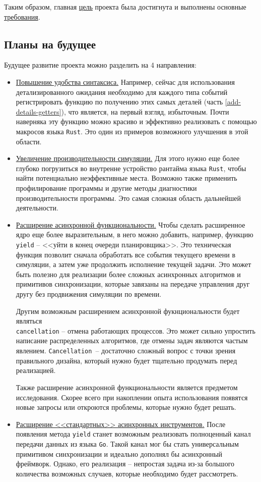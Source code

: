 Таким образом, главная \hyperref[main-purpose]{цель} проекта была достигнута и выполнены основные \hyperref[requirements]{требования}. 

\subsection{Планы на будущее} \label{future-plans}
Будущее развитие проекта можно разделить на 4 направления: 
\begin{itemize}
    \item \underline{Повышение удобства синтаксиса.} Например, сейчас для использования детализированного ожидания необходимо для каждого типа событий регистрировать функцию по получению этих самых деталей (часть \ref{add-details-getters}), что является, на первый взгляд, избыточным. Почти наверняка эту функцию можно красиво и эффективно реализовать с помощью макросов языка \texttt{Rust}. Это один из примеров возможного улучшения в этой области. 
    \item \underline{Увеличение производительности симуляции.} Для этого нужно еще более глубоко погрузиться во внутренне устройство рантайма языка \texttt{Rust}, чтобы найти потенциально неэффективные места. Возможно также применить профилирование программы и другие методы диагностики производительности программы. Это самая сложная область дальнейшей деятельности. 
    \item \underline{Расширение асинхронной функциональности.} Чтобы сделать расширенное ядро еще более выразительным, в него можно добавить, например, функцию \texttt{yield} -- <<уйти в конец очереди планировщика>>. Это техническая функция позволит сначала обработать все события текущего времени в симуляции, а затем уже продолжить исполнение текущей задачи. Это может быть полезно для реализации более сложных асинхронных алгоритмов и примитивов синхронизации, которые завязаны на передаче управления друг другу без продвижения симуляции по времени. 
    
    Другим возможным расширением асинхронной фукнциональности будет являться \\ \texttt{cancellation} -- отмена работающих процессов. Это может сильно упростить написание распределенных алгоритмов, где отмены задач являются частым явлением. \texttt{Cancellation}~-- достаточно сложный вопрос с точки зрения правильного дизайна, который нужно будет тщательно продумать перед реализацией.
    
    Также расширение асинхронной функциональности является предметом исследования. Скорее всего при накоплении опыта использования появятся новые запросы или откроются проблемы, которые нужно будет решать.
    \item \underline{Расширение <<стандартных>> асинхронных инструментов.} После появления метода \texttt{yield} станет возможным реализовать полноценный канал передачи данных из языка \texttt{Go}. Такой канал мог бы стать универсальным примитивом синхронизации и  идеально дополнял бы асинхронный фреймворк. Однако, его реализация -- непростая задача из-за большого количества возможных случаев, которые необходимо будет рассмотреть.  
    

\end{itemize}
